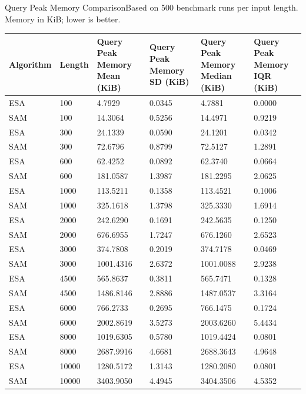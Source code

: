 \begin{benchmarktable}{Query Peak Memory Comparison}{Based on 500 benchmark runs per input length. Memory in KiB; lower is better.}
\begin{tabularx}{\textwidth}{|X|X|X|X|X|X|}
\toprule
Algorithm & Length & Query Peak Memory Mean (KiB) & Query Peak Memory SD (KiB) & Query Peak Memory Median (KiB) & Query Peak Memory IQR (KiB) \\
\midrule
ESA & 100 & 4.7929 & 0.0345 & 4.7881 & 0.0000 \\
SAM & 100 & 14.3064 & 0.5256 & 14.4971 & 0.9219 \\
\hline
ESA & 300 & 24.1339 & 0.0590 & 24.1201 & 0.0342 \\
SAM & 300 & 72.6796 & 0.8799 & 72.5127 & 1.2891 \\
\hline
ESA & 600 & 62.4252 & 0.0892 & 62.3740 & 0.0664 \\
SAM & 600 & 181.0587 & 1.3987 & 181.2295 & 2.0625 \\
\hline
ESA & 1000 & 113.5211 & 0.1358 & 113.4521 & 0.1006 \\
SAM & 1000 & 325.1618 & 1.3798 & 325.3330 & 1.6914 \\
\hline
ESA & 2000 & 242.6290 & 0.1691 & 242.5635 & 0.1250 \\
SAM & 2000 & 676.6955 & 1.7247 & 676.1260 & 2.6523 \\
\hline
ESA & 3000 & 374.7808 & 0.2019 & 374.7178 & 0.0469 \\
SAM & 3000 & 1001.4316 & 2.6372 & 1001.0088 & 2.9238 \\
\hline
ESA & 4500 & 565.8637 & 0.3811 & 565.7471 & 0.1328 \\
SAM & 4500 & 1486.8146 & 2.8886 & 1487.0537 & 3.3164 \\
\hline
ESA & 6000 & 766.2733 & 0.2695 & 766.1475 & 0.1724 \\
SAM & 6000 & 2002.8619 & 3.5273 & 2003.6260 & 5.4434 \\
\hline
ESA & 8000 & 1019.6305 & 0.5780 & 1019.4424 & 0.0801 \\
SAM & 8000 & 2687.9916 & 4.6681 & 2688.3643 & 4.9648 \\
\hline
ESA & 10000 & 1280.5172 & 1.3143 & 1280.2080 & 0.0801 \\
SAM & 10000 & 3403.9050 & 4.4945 & 3404.3506 & 4.5352 \\
\bottomrule
\end{tabularx}
\end{benchmarktable}


